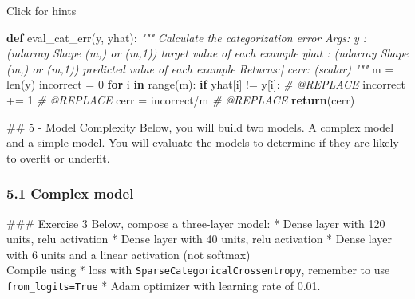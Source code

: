 \documentclass[11pt]{article}
\newenvironment{Shaded}{}{}
\newcommand{\KeywordTok}[1]{\textcolor[rgb]{0.00,0.44,0.13}{\textbf{{#1}}}}
\newcommand{\DecValTok}[1]{\textcolor[rgb]{0.25,0.63,0.44}{{#1}}}
\newcommand{\CommentTok}[1]{\textcolor[rgb]{0.38,0.63,0.69}{\textit{{#1}}}}
\newcommand{\NormalTok}[1]{{#1}}
\newcommand{\ControlFlowTok}[1]{\textcolor[rgb]{0.00,0.44,0.13}{\textbf{{#1}}}}
\newcommand{\OperatorTok}[1]{\textcolor[rgb]{0.40,0.40,0.40}{{#1}}}
\newcommand{\BuiltInTok}[1]{{#1}}
\begin{document}
    Click for hints

\begin{Shaded}
\begin{Highlighting}[]
\KeywordTok{def}\NormalTok{ eval\_cat\_err(y, yhat):}
    \CommentTok{""" }
\CommentTok{    Calculate the categorization error}
\CommentTok{    Args:}
\CommentTok{      y    : (ndarray  Shape (m,) or (m,1))  target value of each example}
\CommentTok{      yhat : (ndarray  Shape (m,) or (m,1))  predicted value of each example}
\CommentTok{    Returns:|}
\CommentTok{      cerr: (scalar)             }
\CommentTok{    """}
\NormalTok{    m }\OperatorTok{=} \BuiltInTok{len}\NormalTok{(y)}
\NormalTok{    incorrect }\OperatorTok{=} \DecValTok{0}
    \ControlFlowTok{for}\NormalTok{ i }\KeywordTok{in} \BuiltInTok{range}\NormalTok{(m):}
        \ControlFlowTok{if}\NormalTok{ yhat[i] }\OperatorTok{!=}\NormalTok{ y[i]:    }\CommentTok{\# @REPLACE}
\NormalTok{            incorrect }\OperatorTok{+=} \DecValTok{1}     \CommentTok{\# @REPLACE}
\NormalTok{    cerr }\OperatorTok{=}\NormalTok{ incorrect}\OperatorTok{/}\NormalTok{m         }\CommentTok{\# @REPLACE}
    \ControlFlowTok{return}\NormalTok{(cerr)                                    }
\end{Highlighting}
\end{Shaded}

    \#\# 5 - Model Complexity Below, you will build two models. A complex
model and a simple model. You will evaluate the models to determine if
they are likely to overfit or underfit.

\hypertarget{complex-model}{%
\subsubsection{5.1 Complex model}\label{complex-model}}

\#\#\# Exercise 3 Below, compose a three-layer model: * Dense layer with
120 units, relu activation * Dense layer with 40 units, relu activation
* Dense layer with 6 units and a linear activation (not softmax)\\
Compile using * loss with \texttt{SparseCategoricalCrossentropy},
remember to use \texttt{from\_logits=True} * Adam optimizer with
learning rate of 0.01.
\end{document}
